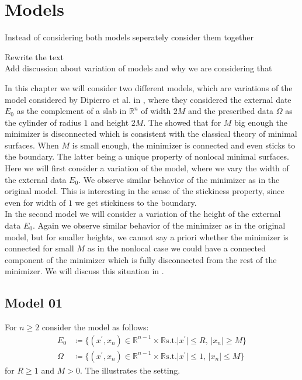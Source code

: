 \chapter{Models}
\label{ch:models}

\begin{TODO}
	Instead of considering both models seperately consider them together
\end{TODO}




\begin{TODO}
	Rewrite the text \\
	Add discussion about variation of models and why we are considering that
\end{TODO}

In this chapter we will consider two different models, which are variations of the model
considered by Dipierro et al. in \cite{dipierro2020disconnectedness}, where they
considered the external date \( E_0 \) as the complement of a slab in \( \mathbb{R}^n \)
of width \( 2M \) and the prescribed data \( \Omega \) as the cylinder of radius \( 1 \)
and height \( 2M \). The showed that for \( M \) big enough the minimizer is disconnected
which is consistent with the classical theory of minimal surfaces. When \( M \) is small
enough, the minimizer is connected and even sticks to the boundary. The latter being a
unique property of nonlocal minimal surfaces. \\ Here we will first consider a variation
of the model, where we vary the width of the external data \( E_0 \). We observe similar
behavior of the minimizer as in the original model. This is interesting in the sense of
the stickiness property, since even for width of \( 1 \) we get stickiness to the
boundary. \\ In the second model we will consider a variation of the height of the
external data \( E_0 \). Again we observe similar behavior of the minimizer as in the
original model, but for smaller heights, we cannot say a priori whether the minimizer is
connected for small \( M \) as in the nonlocal case we could have a connected component of
the minimizer which is fully disconnected from the rest of the minimizer. We will discuss
this situation in .


\section{Model 01}
\label{sec:model01}


For \( n \geq 2 \) consider the model as follows:
\begin{align*}
	E_0    & \coloneqq \{(x^\prime, x_n) \in \mathbb{R}^{n - 1} \times \mathbb{R} \text{s.t.} \lvert x^\prime \rvert \leq R, \, \lvert x_n \rvert \geq M \} \\
	\Omega & \coloneqq \{(x^\prime, x_n) \in \mathbb{R}^{n - 1} \times \mathbb{R} \text{s.t.} \lvert x^\prime \rvert \leq 1, \, \lvert x_n \rvert \leq M \}
\end{align*}
for \( R \geq 1 \) and \( M > 0 \). The  illustrates the setting.

